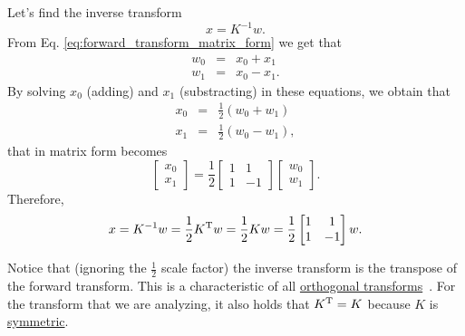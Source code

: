 Let's find the inverse
transform
\begin{equation}
  x = K^{-1}w.
  \label{eq:inverse_transform}
\end{equation}
From Eq. \ref{eq:forward_transform_matrix_form} we get that
\begin{equation}
  \begin{array}{rcl}
  w_0 & = & x_0 + x_1\\
  w_1 & = & x_0 - x_1.
  \end{array}
\end{equation}
By solving $x_0$ (adding) and $x_1$ (substracting) in
these equations, we obtain that
\begin{equation}
  \begin{array}{rcl}
  x_0 & = & \frac{1}{2}(w_0 + w_1)\\
  x_1 & = & \frac{1}{2}(w_0 - w_1),
  \end{array}
\end{equation}
that in matrix form becomes
\begin{equation}
  \begin{bmatrix}
    x_0 \\
    x_1
  \end{bmatrix}
  = \frac{1}{2}
  \begin{bmatrix} 1 & 1 \\ 1 & -1 \end{bmatrix}
  \begin{bmatrix}
    w_0 \\
    w_1
  \end{bmatrix}.
\end{equation}
Therefore,
\begin{equation}
  x = K^{-1}w = \frac{1}{2}K^{\text T}w = \frac{1}{2}Kw = \frac{1}{2}\begin{bmatrix} 1 & 1 \\ 1 & -1 \end{bmatrix}w.
  \label{eq:inverse_transform_matrix_form}
\end{equation}

Notice that (ignoring the $\frac{1}{2}$ scale factor) the inverse
transform is the transpose of the forward transform. This is a
characteristic of all
\href{https://en.wikipedia.org/wiki/Orthogonal_transformation}{orthogonal
  transforms}~\cite{sayood2017introduction}. For the transform that we
are analyzing, it also holds that $K^{\text T}=K$ because $K$ is
\href{https://en.wikipedia.org/wiki/Symmetric_matrix}{symmetric}.

